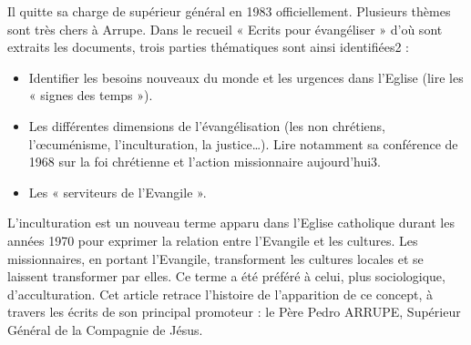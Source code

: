 Il quitte sa charge de supérieur général en 1983 officiellement.
Plusieurs thèmes sont très chers à Arrupe. Dans le recueil « Ecrits pour évangéliser » d’où sont extraits les documents, trois parties thématiques sont ainsi identifiées2 :
\begin{itemize}
    \item  	Identifier les besoins nouveaux du monde et les urgences dans l’Eglise (lire les
« signes des temps »).
    \item 	Les différentes dimensions de l’évangélisation (les non chrétiens, l’œcuménisme, l’inculturation, la justice…). Lire notamment sa conférence de 1968 sur la foi chrétienne et l’action missionnaire aujourd’hui3.
    \item Les « serviteurs de l’Evangile ».
\end{itemize}

\begin{Def}[Inculturation]
    L'inculturation est un nouveau terme apparu dans l'Eglise catholique durant les années 1970 pour exprimer la relation entre
l'Evangile et les cultures. Les missionnaires, en portant l'Evangile, transforment les cultures locales et se laissent transformer
par elles. Ce terme a été préféré à celui, plus sociologique, d'acculturation. Cet article retrace l'histoire de l'apparition de ce
concept, à travers les écrits de son principal promoteur : le Père Pedro ARRUPE, Supérieur Général de la Compagnie de
Jésus.
\end{Def}
\ 

